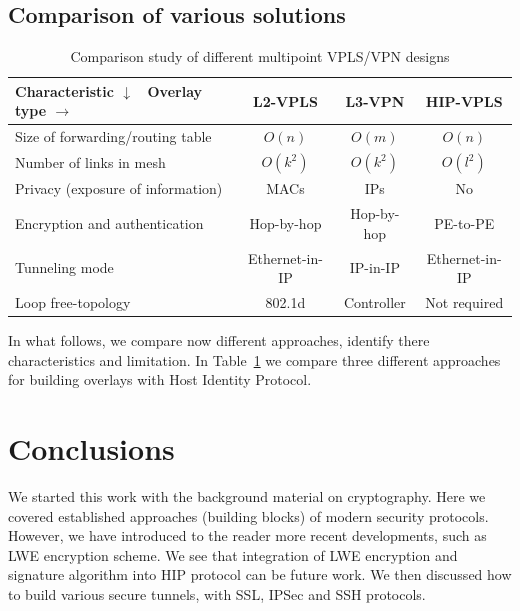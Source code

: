 \section{Comparison of various solutions}

\begin{table}
    \small
    \begin{tabular}{|l|c|c|c|}
    \hline
    Characteristic $\downarrow$ \ Overlay type $\rightarrow$ & L2-VPLS & L3-VPN & HIP-VPLS \\\hline
    Size of forwarding/routing table & $O(n)$ & $O(m)$ & $O(n)$\\\hline
    Number of links in mesh & $O(k^2)$ & $O(k^2)$ & $O(l^2)$ \\\hline
    Privacy (exposure of information) & MACs & IPs & No \\\hline
    Encryption and authentication & Hop-by-hop & Hop-by-hop & PE-to-PE \\\hline
    Tunneling mode & Ethernet-in-IP & IP-in-IP & Ethernet-in-IP \\\hline
    Loop free-topology & 802.1d & Controller & Not required \\\hline
    \end{tabular}
    \label{analysis}
    \caption {Comparison study of different multipoint VPLS/VPN designs}
\end{table}

In what follows, we compare now different approaches, identify there
characteristics and limitation. In Table~\ref{analysis} we 
compare three different approaches for building overlays with Host 
Identity Protocol. 

\chapter{Conclusions}

We started this work with the background material on cryptography. Here we covered
established approaches (building blocks) of modern security protocols. However, we 
have introduced to the reader more recent developments, such as LWE encryption scheme.
We see that integration of LWE encryption and signature algorithm into HIP protocol 
can be future work. We then discussed how to build various secure tunnels, \eg with 
SSL, IPSec and SSH protocols. 


